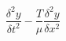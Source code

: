 \documentclass[12pt]{article}
\begin{document}
\[
	\boxed{\dfrac{\delta^2y}{\delta t^2} - \dfrac{T}{\mu} \dfrac{\delta^2 y}{\delta x^2}} 
\]
\end{document}
